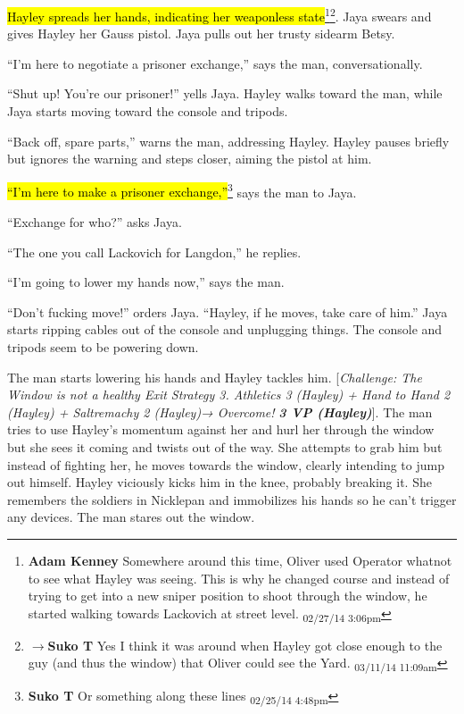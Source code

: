 \hl{Hayley spreads her hands, indicating her weaponless state}\footnote{\textbf{Adam Kenney }Somewhere around this time, Oliver used Operator whatnot to see what Hayley was seeing. This is why he changed course and instead of trying to get into a new sniper position to shoot through the window, he started walking towards Lackovich at street level. \textsubscript{02/27/14 3:06pm}}\footnote{$\rightarrow$\textbf{Suko T }Yes I think it was around when Hayley got close enough to the guy (and thus the window) that Oliver could see the Yard. \textsubscript{03/11/14 11:09am}}.  Jaya swears and gives Hayley her Gauss pistol.  Jaya pulls out her trusty sidearm Betsy.  



``I'm here to negotiate a prisoner exchange,'' says the man, conversationally.

``Shut up!  You're our prisoner!'' yells Jaya.  Hayley walks toward the man, while Jaya starts moving toward the console and tripods.



``Back off, spare parts,'' warns the man, addressing Hayley.  Hayley pauses briefly but ignores the warning and steps closer, aiming the pistol at him.



\hl{``I'm here to make a prisoner exchange,''}\footnote{\textbf{Suko T }Or something along these lines \textsubscript{02/25/14 4:48pm}} says the man to Jaya.

``Exchange for who?'' asks Jaya.

``The one you call Lackovich for Langdon,'' he replies.



``I'm going to lower my hands now,'' says the man.

``Don't fucking move!'' orders Jaya.  ``Hayley, if he moves, take care of him.''  Jaya starts ripping cables out of the console and unplugging things.  The console and tripods seem to be powering down.



The man starts lowering his hands and Hayley tackles him.  {[}\textit{Challenge: The Window is not a healthy Exit Strategy 3. Athletics 3 (Hayley) + Hand to Hand 2 (Hayley) + Saltremachy 2 (Hayley)→ Overcome! }\textit{\textbf{3 VP (Hayley)}}{]}.  The man tries to use Hayley's momentum against her and hurl her through the window but she sees it coming and twists out of the way.  She attempts to grab him but instead of fighting her, he moves towards the window, clearly intending to jump out himself.  Hayley viciously kicks him in the knee, probably breaking it.  She remembers the soldiers in Nicklepan and immobilizes his hands so he can't trigger any devices.  The man stares out the window.



